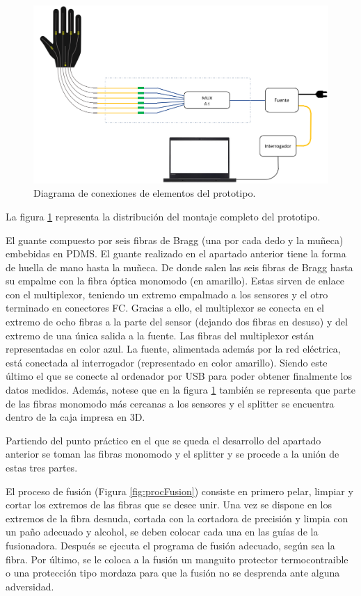 \begin{itemize}
	\begin{figure}[H]
		\centering
		\includegraphics[width=1\textwidth]{./img/diagramaFBG}
		\caption{Diagrama de conexiones de elementos del prototipo.} \label{fig:diagramaFBG}
	\end{figure}
	
	La figura \ref{fig:diagramaFBG} representa la distribución del montaje completo del prototipo. 
	
	El guante compuesto por seis fibras de Bragg (una por cada dedo y la muñeca) embebidas en PDMS. El guante realizado en el apartado anterior tiene la forma de huella de mano hasta la muñeca. De donde salen las seis fibras de Bragg hasta su empalme con la fibra óptica monomodo (en amarillo). Estas sirven de enlace con el multiplexor, teniendo un extremo empalmado a los sensores y el otro terminado en conectores FC. Gracias a ello, el multiplexor se conecta en el extremo de ocho fibras a la parte del sensor (dejando dos fibras en desuso) y del extremo de una única salida a la fuente. Las fibras del multiplexor están representadas en color azul. La fuente, alimentada además por la red eléctrica, está conectada al interrogador (representado en color amarillo). Siendo este último el que se conecte al ordenador por USB para poder obtener finalmente los datos medidos. Además, notese que en la figura \ref{fig:diagramaFBG} también se representa que parte de las fibras monomodo más cercanas a los sensores y el splitter se encuentra dentro de la caja impresa en 3D. 
	
	Partiendo del punto práctico en el que se queda el desarrollo del apartado anterior se toman las fibras monomodo y el splitter y se procede a la unión de estas tres partes. 
	
	El proceso de fusión (Figura \ref{fig:procFusion}) consiste en primero pelar, limpiar y cortar los extremos de las fibras que se desee unir. Una vez se dispone en los extremos de la fibra desnuda, cortada con la cortadora de precisión y limpia con un paño adecuado y alcohol, se deben colocar cada una en las guías de la fusionadora. Después se ejecuta el programa de fusión adecuado, según sea la fibra. Por último, se le coloca a la fusión un manguito protector termocontraible o una protección tipo mordaza para que la fusión no se desprenda ante alguna adversidad. 
	

\end{itemize}
